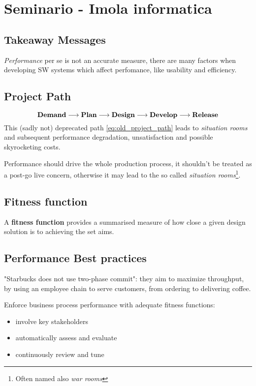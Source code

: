 \chapter{Seminario - Imola informatica}
\section{Takeaway Messages}
\textit{Performance} per se is not an accurate measure,
there are many factors when developing SW systems which affect perfomance,
like usability and efficiency.

\section{Project Path}
\begin{equation}
\label{eq:old_project_path}
\textbf{Demand} \longrightarrow \textbf{Plan} \longrightarrow \textbf{Design} \longrightarrow \textbf{Develop} \longrightarrow \textbf{Release}\\
\end{equation}
This (sadly not) deprecated path \ref{eq:old_project_path} leads to \textit{situation rooms} and subsequent performance degradation, unsatisfaction and possible skyrocketing costs.

Performance should drive the whole production process, it shouldn't be treated as a post-go live concern,
otherwise it may lead to the so called \textit{situation rooms}\footnote{Often named also \textit{war rooms}}.

\section{Fitness function}
A \textbf{fitness function} provides a summarised measure of how close a given design solution is to achieving the set aims.

\section{Performance Best practices}
"Starbucks does not use two-phase commit": they aim to maximize throughput, by using an employee chain to serve customers, from ordering to delivering coffee.

Enforce business process performance with adequate fitness functions:
\begin{itemize}
    \item involve key stakeholders
    \item automatically assess and evaluate
    \item continuously review and tune
\end{itemize}

